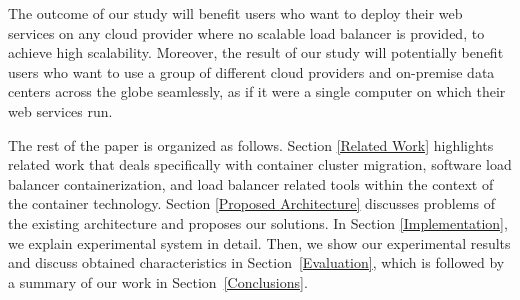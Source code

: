 The outcome of our study will benefit users who want to deploy their web services on any cloud provider where no scalable load balancer is provided, to achieve high scalability.
Moreover, the result of our study will potentially benefit users who want to use a group of different cloud providers and on-premise data centers across the globe seamlessly, as if it were a single computer on which their web services run.

The rest of the paper is organized as follows.
Section \ref{Related Work} highlights related work that deals specifically with container cluster migration,
software load balancer containerization, and load balancer related tools within the context of the container technology.
Section \ref{Proposed Architecture} discusses problems of the existing architecture and proposes our solutions.
In Section \ref{Implementation}, we explain experimental system in detail.
Then, we show our experimental results and discuss obtained characteristics in Section~\ref{Evaluation}, which is followed by a summary of our work in Section~\ref{Conclusions}.





